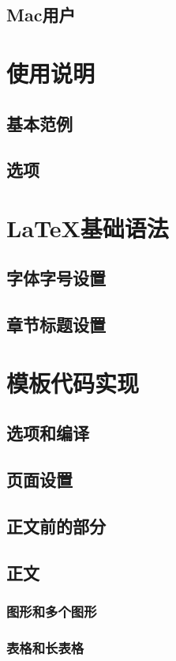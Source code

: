 \documentclass[doctor,openright]{buaathesis}
\begin{document}
	\section{Mac用户}
	
\chapter{使用说明}
	\section{基本范例}
	\section{选项}
\chapter{LaTeX{}基础语法}
	\section{字体字号设置}
	\section{章节标题设置}
	
\chapter{模板代码实现}
	\section{选项和编译}
	\section{页面设置}
	\newpage
	\section{正文前的部分}
	\section{正文}
		\subsection{图形和多个图形}
		\subsection{表格和长表格}
\end{document}
